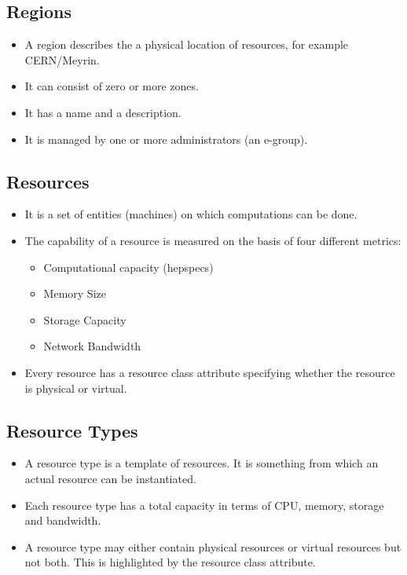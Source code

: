 \documentclass[12pt]{article}
\begin{document}
\subsection{Regions}
\begin{itemize}
\item A region describes the a physical location of resources, for example CERN/Meyrin. 
\item It can consist of zero or more zones.
\item It has a name and a description.
\item It is managed by one or more administrators (an e-group).
\end{itemize}

\subsection {Resources}
\begin{itemize}
\item It is a set of entities (machines) on which computations can be done.
\item The capability of a resource is measured on the basis of four different metrics:
\begin{itemize}
\item Computational capacity (hepspecs)
\item Memory Size
\item Storage Capacity
\item Network Bandwidth 
\end{itemize}
\item Every resource has a resource class attribute specifying whether the resource is physical or virtual.
\end{itemize}

\subsection {Resource Types}
\begin{itemize}
\item A resource type is a template of resources. It is something from which an actual resource can be instantiated.
\item Each resource type has a total capacity in terms of CPU, memory, storage and bandwidth.
\item A resource type may either contain physical resources or virtual resources but not both. This is highlighted by the resource class attribute.
\end{itemize} 
\end{document}
